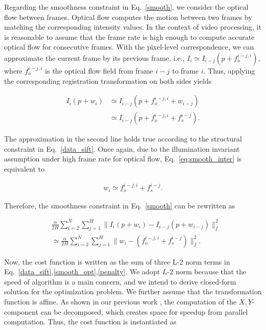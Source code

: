 \documentclass[10pt,journal]{IEEEtran}
\begin{document}
Regarding the smoothness constraint in Eq.~\ref{smooth}, we consider the optical flow between frames. Optical flow computes the motion between two frames by matching the corresponding intensity values. In the context of video processing, it is reasonable to assume that the frame rate is high enough to compute accurate optical flow for consecutive frames. With the pixel-level correspondence, we can approximate the current frame by its previous frame, i.e., $I_i\simeq I_{i-j}(p+f_o^{i-j,i})$, where $f_o^{i-j,i}$ is the optical flow field from frame $i-j$ to frame $i$. Thus, applying the corresponding registration transformation on both sides yields

\begin{align}
\label{eq:smooth_inter}
I_i(p+w_i)& \simeq I_{i-j}(p+f_o^{i-j,i}+w_{i-j}) \nonumber \\
					& \simeq I_{i-j}(p+f_o^{i-j,i}+f_s^{i-j}).
\end{align}

The approximation in the second line holds true according to the structural constraint in Eq.~\ref{data_sift}. Once again, due to the illumination invariant assumption under high frame rate for optical flow, Eq.~\ref{eq:smooth_inter} is equivalent to

\begin{align}
w_i \simeq f_o^{i-j,i}+f_s^{i-j}.	\nonumber
\end{align}

Therefore, the smoothness constraint in Eq.~\ref{smooth} can be rewritten as

\begin{align}
\label{smooth_opt}
&\frac{\alpha}{2H}\sum_{i=2}^{N}\sum_{j=1}^{H}\parallel{I_i(p+w_i)-I_{i-j}(p+w_{i-j})}\parallel_f^2 \nonumber \\
&\simeq\frac{\alpha}{2H}\sum_{i=2}^{N}\sum_{j=1}^{H}\parallel{w_i-(f_o^{i-j,i}+f_s^{i-j})}\parallel_f^2.
\end{align}


Now, the cost function is written as the sum of three L-2 norm terms in Eq.~\ref{data_sift},\ref{smooth_opt},\ref{penalty}. We adopt $L$-2 norm because that the speed of algorithm is a main concern, and we intend to derive closed-form solution for the optimization problem. We further assume that the transformation function is affine. As shown in our previous work \cite{Yang_FG13}, the computation of the $X,Y$-component can be decomposed, which creates space for speedup from parallel computation. Thus, the cost function is instantiated as
\end{document}
